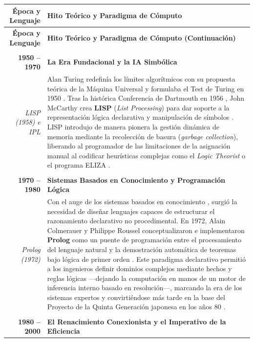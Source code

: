 \documentclass[12pt, a4paper]{article}
\begin{document}
\begin{longtable}{r | p{}}
\textbf{Época y Lenguaje} & \textbf{Hito Teórico y Paradigma de Cómputo} \\
\hline
\endfirsthead
\textbf{Época y Lenguaje} & \textbf{Hito Teórico y Paradigma de Cómputo (Continuación)} \\
\hline
\endhead
& \\
\textbf{1950 -- 1970} & \textbf{La Era Fundacional y la IA Simbólica} \\
\textit{LISP (1958) e IPL} & Alan Turing redefinía los límites algorítmicos con su propuesta teórica de la Máquina Universal \parencite{zhang2023turing} y formulaba el Test de Turing en 1950 \parencite{haenlein2019brief}. Tras la histórica Conferencia de Dartmouth en 1956 \parencite{haenlein2019brief}, John McCarthy crea \textbf{LISP} (\textit{List Processing}) para dar soporte a la representación lógica declarativa y manipulación de símbolos \parencite{buchanan2005very}. LISP introdujo de manera pionera la gestión dinámica de memoria mediante la recolección de basura (\textit{garbage collection}), liberando al programador de las limitaciones de la asignación manual al codificar heurísticas complejas como el \textit{Logic Theorist} o el programa ELIZA \parencite{haenlein2019brief, buchanan2005very}. \\
& \\
\textbf{1970 -- 1980} & \textbf{Sistemas Basados en Conocimiento y Programación Lógica} \\
\textit{Prolog (1972)} & Con el auge de los sistemas basados en conocimiento \parencite{buchanan2005very}, surgió la necesidad de diseñar lenguajes capaces de estructurar el razonamiento declarativo no procedimental. En 1972, Alain Colmerauer y Philippe Roussel conceptualizaron e implementaron \textbf{Prolog} como un puente de programación entre el procesamiento del lenguaje natural y la demostración automática de teoremas bajo lógica de primer orden \parencite{colmerauer1996birth}. Este paradigma declarativo permitió a los ingenieros definir dominios complejos mediante hechos y reglas lógicas ---dejando la computación en manos de un motor de inferencia interno basado en resolución---, marcando la era de los sistemas expertos y convirtiéndose más tarde en la base del Proyecto de la Quinta Generación japonesa en los años 80 \parencite{haenlein2019brief, colmerauer1996birth}. \\
& \\
\textbf{1980 -- 2000} & \textbf{El Renacimiento Conexionista y el Imperativo de la Eficiencia} \\

\end{longtable}
\end{document}
